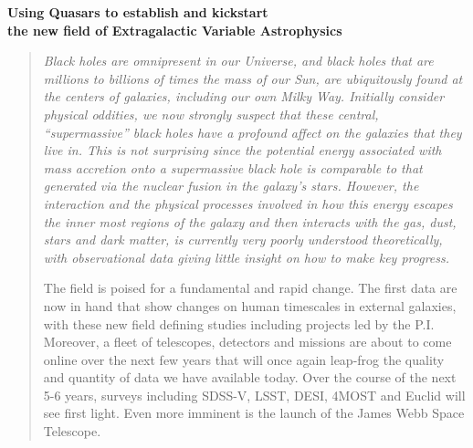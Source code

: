 \documentclass[oneside, a4paper, onecolumn, 11pt]{article}
\begin{document}
\begin{center}
 {\Large \bf \textcolor{Cerulean}{Using Quasars to establish and kickstart \\}}
\vspace{4pt} 
  {\Large \bf \textcolor{Cerulean}{the new field of Extragalactic Variable Astrophysics} }
\end{center}

\begin{quotation}
\noindent
{\it 
Black holes are omnipresent in our Universe, and black holes that are
millions to billions of times the mass of our Sun, are ubiquitously
found at the centers of galaxies, including our own Milky Way.
Initially consider physical oddities, we now strongly suspect that
these central, ``supermassive'' black holes have a profound
affect on the galaxies that they live in. This is not surprising since
the potential energy associated with mass accretion onto a
supermassive black hole is comparable to that generated via the
nuclear fusion in the galaxy's stars.
However, the interaction and the physical processes involved in how
this energy escapes the inner most regions of the galaxy and then
interacts with the gas, dust, stars and dark matter, is currently very
poorly understood theoretically, with observational data giving little 
insight on how to make key progress.

The field is poised for a fundamental and rapid change. The first data
are now in hand that show changes on human timescales in external
galaxies, with these new field defining studies including projects led
by the P.I.  Moreover, a fleet of telescopes, detectors and missions
are about to come online over the next few years that will once again
leap-frog the quality and quantity of data we have available
today. Over the course of the next 5-6 years, surveys including
SDSS-V, LSST, DESI, 4MOST and Euclid will see first light. Even more
imminent is the launch of the James Webb Space Telescope.

}
\end{quotation}
\end{document}
